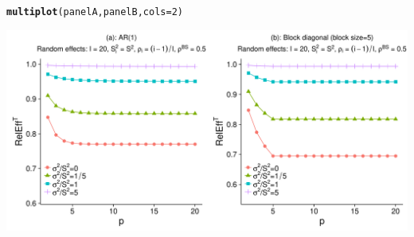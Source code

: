 \documentclass{article}\usepackage[]{graphicx}\usepackage[]{color}
\makeatletter
\def\maxwidth{ %
  \ifdim\Gin@nat@width>\linewidth
    \linewidth
  \else
    \Gin@nat@width
  \fi
}
\newcommand{\hlnum}[1]{\textcolor[rgb]{0.686,0.059,0.569}{#1}}%
\newcommand{\hlstd}[1]{\textcolor[rgb]{0.345,0.345,0.345}{#1}}%
\newcommand{\hlkwc}[1]{\textcolor[rgb]{0.333,0.667,0.333}{#1}}%
\newcommand{\hlkwd}[1]{\textcolor[rgb]{0.737,0.353,0.396}{\textbf{#1}}}%
\newenvironment{kframe}{%
 \def\at@end@of@kframe{}%
 \ifinner\ifhmode%
  \def\at@end@of@kframe{\end{minipage}}%
  \begin{minipage}{\columnwidth}%
 \fi\fi%
 \def\FrameCommand##1{\hskip\@totalleftmargin \hskip-\fboxsep
 \colorbox{shadecolor}{##1}\hskip-\fboxsep
     \hskip-\linewidth \hskip-\@totalleftmargin \hskip\columnwidth}%
 \MakeFramed {\advance\hsize-\width
   \@totalleftmargin\z@ \linewidth\hsize
   \@setminipage}}%
 {\par\unskip\endMakeFramed%
 \at@end@of@kframe}
\newenvironment{knitrout}{}{} %
\makeatother
\begin{document}
\begin{knitrout}
\color{fgcolor}\begin{kframe}
\begin{alltt}
\hlkwd{multiplot}\hlstd{(panelA, panelB,} \hlkwc{cols}\hlstd{=}\hlnum{2}\hlstd{)}
\end{alltt}


{\ttfamily\noindent\itshape\color{messagecolor}{\#\# Loading required package: grid}}\end{kframe}

{\centering \includegraphics[width=\maxwidth]{figures/Figure_S8_panels_ab-1} 

}



\end{knitrout}
\end{document}
